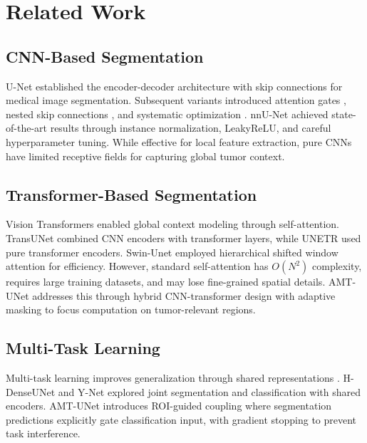 \section{Related Work}

\subsection{CNN-Based Segmentation}

U-Net \cite{ronneberger2015unet} established the encoder-decoder architecture with skip connections for medical image segmentation. Subsequent variants introduced attention gates \cite{oktay2018attention}, nested skip connections \cite{zhou2018unet++}, and systematic optimization \cite{isensee2021nnu}. nnU-Net \cite{isensee2021nnu} achieved state-of-the-art results through instance normalization, LeakyReLU, and careful hyperparameter tuning. While effective for local feature extraction, pure CNNs have limited receptive fields for capturing global tumor context.

\subsection{Transformer-Based Segmentation}

Vision Transformers \cite{dosovitskiy2020image} enabled global context modeling through self-attention. TransUNet \cite{chen2021transunet} combined CNN encoders with transformer layers, while UNETR \cite{hatamizadeh2022unetr} used pure transformer encoders. Swin-Unet \cite{cao2022swin} employed hierarchical shifted window attention for efficiency. However, standard self-attention has $O(N^2)$ complexity, requires large training datasets, and may lose fine-grained spatial details. AMT-UNet addresses this through hybrid CNN-transformer design with adaptive masking to focus computation on tumor-relevant regions.

\subsection{Multi-Task Learning}

Multi-task learning improves generalization through shared representations \cite{caruana1997multitask}. H-DenseUNet \cite{li2018hdenseunet} and Y-Net \cite{mehta2018ynet} explored joint segmentation and classification with shared encoders. AMT-UNet introduces ROI-guided coupling where segmentation predictions explicitly gate classification input, with gradient stopping to prevent task interference.

